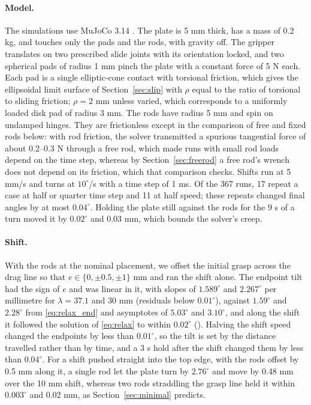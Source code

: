 \paragraph{Model.}
The simulations use MuJoCo 3.14 \cite{todorov2012mujoco}. The plate is 5 mm thick, has a mass of 0.2 kg, and touches only the pads and the rods, with gravity off. The gripper translates on two prescribed slide joints with its orientation locked, and two spherical pads of radius 1 mm pinch the plate with a constant force of 5 N each. Each pad is a single elliptic-cone contact with torsional friction, which gives the ellipsoidal limit surface of Section~\ref{sec:slip} with $\rho$ equal to the ratio of torsional to sliding friction; $\rho=2$ mm unless varied, which corresponds to a uniformly loaded disk pad of radius 3 mm. The rods have radius 5 mm and spin on undamped hinges. They are frictionless except in the comparison of free and fixed rods below: with rod friction, the solver transmitted a spurious tangential force of about 0.2--0.3 N through a free rod, which made runs with small rod loads depend on the time step, whereas by Section~\ref{sec:freerod} a free rod's wrench does not depend on its friction, which that comparison checks. Shifts run at 5 mm/s and turns at $10^{\circ}$/s with a time step of 1 ms. Of the 367 runs, 17 repeat a case at half or quarter time step and 11 at half speed; these repeats changed final angles by at most $0.04^{\circ}$. Holding the plate still against the rods for the 9 s of a turn moved it by $0.02^{\circ}$ and 0.03 mm, which bounds the solver's creep.

\paragraph{Shift.}
With the rods at the nominal placement, we offset the initial grasp across the drag line so that $e\in\{0,\pm0.5,\pm1\}$ mm and ran the shift alone. The endpoint tilt had the sign of $e$ and was linear in it, with slopes of $1.589^{\circ}$ and $2.267^{\circ}$ per millimetre for $\lambda=37.1$ and 30 mm (residuals below $0.01^{\circ}$), against $1.59^{\circ}$ and $2.28^{\circ}$ from \eqref{eq:relax_end} and asymptotes of $5.03^{\circ}$ and $3.10^{\circ}$, and along the shift it followed the solution of \eqref{eq:relax} to within $0.02^{\circ}$ (). Halving the shift speed changed the endpoints by less than $0.01^{\circ}$, so the tilt is set by the distance travelled rather than by time, and a 3 s hold after the shift changed them by less than $0.04^{\circ}$. For a shift pushed straight into the top edge, with the rods offset by 0.5 mm along it, a single rod let the plate turn by $2.76^{\circ}$ and move by 0.48 mm over the 10 mm shift, whereas two rods straddling the grasp line held it within $0.003^{\circ}$ and 0.02 mm, as Section~\ref{sec:minimal} predicts.

